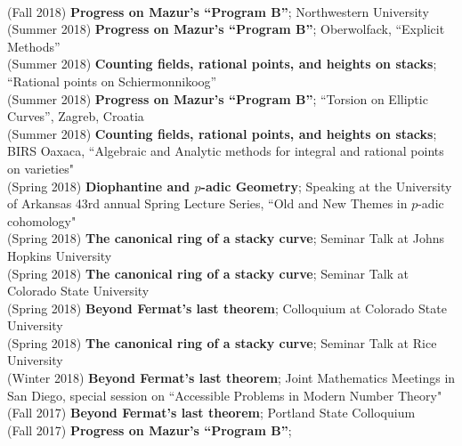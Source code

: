 \documentclass[margin,line]{res}
\begin{document}
\begin{resume}
\vspace{.05cm}\\
(Fall 2018) \textbf{Progress on Mazur's ``Program B''};  
Northwestern University
\vspace{.05cm}\\
(Summer 2018) \textbf{Progress on Mazur's ``Program B''};  
Oberwolfack, ``Explicit Methods''
\vspace{.05cm}\\
(Summer 2018) \textbf{Counting fields, rational points, and heights on stacks};
``Rational points on Schiermonnikoog''
\vspace{.05cm}\\
(Summer 2018) \textbf{Progress on Mazur's ``Program B''};  
``Torsion on Elliptic Curves'', Zagreb, Croatia
\vspace{.05cm}\\
(Summer 2018) \textbf{Counting fields, rational points, and heights on stacks};
BIRS Oaxaca, ``Algebraic and Analytic methods for integral and rational points on varieties"
\vspace{.05cm}\\
(Spring 2018) \textbf{Diophantine and $p$-adic Geometry};
Speaking at the University of Arkansas 43rd annual Spring Lecture Series, ``Old and New Themes in $p$-adic cohomology"
\vspace{.05cm}\\
(Spring 2018) \textbf{The canonical ring of a stacky curve};  
Seminar Talk at Johns Hopkins University
\\
(Spring 2018) \textbf{The canonical ring of a stacky curve};  
Seminar Talk at Colorado State University
\\
(Spring 2018) \textbf{Beyond Fermat's last theorem};
Colloquium at Colorado State University 
\vspace{.05cm}\\
(Spring 2018) \textbf{The canonical ring of a stacky curve};  
Seminar Talk at Rice University
\vspace{.05cm}\\
(Winter 2018) \textbf{Beyond Fermat's last theorem};
Joint Mathematics Meetings in San Diego, special session on ``Accessible Problems in Modern Number Theory" 
\vspace{.05cm}\\
(Fall 2017) \textbf{Beyond Fermat's last theorem};
Portland State Colloquium
\vspace{.05cm}\\
(Fall 2017) \textbf{Progress on Mazur's ``Program B''};  

\end{resume}
\end{document}
